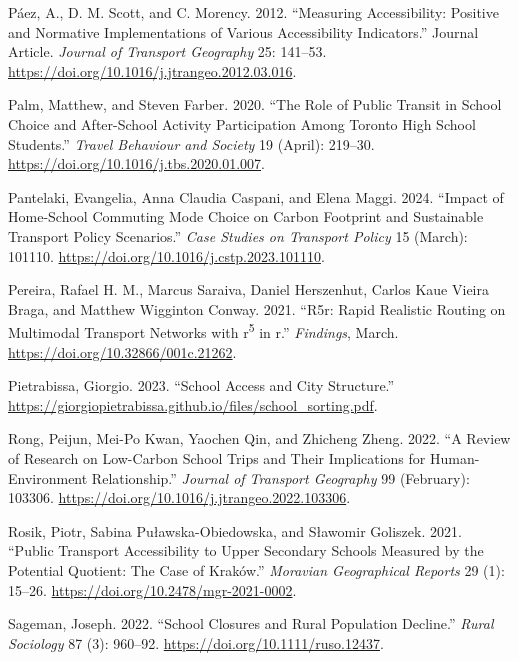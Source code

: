 \documentclass[
default
]{sn-jnl}
\newlength{\cslhangindent}
\newenvironment{CSLReferences}[2] %
 {\begin{list}{}{%
  \setlength{\itemindent}{0pt}
  \setlength{\leftmargin}{0pt}
  \setlength{\parsep}{0pt}
  \ifodd #1
   \setlength{\leftmargin}{\cslhangindent}
   \setlength{\itemindent}{-1\cslhangindent}
  \fi
  \setlength{\itemsep}{#2\baselineskip}}}
 {\end{list}}
\begin{document}
\begin{CSLReferences}{1}{0}
Páez, A., D. M. Scott, and C. Morency. 2012. {``Measuring Accessibility:
Positive and Normative Implementations of Various Accessibility
Indicators.''} Journal Article. \emph{Journal of Transport Geography}
25: 141--53. \url{https://doi.org/10.1016/j.jtrangeo.2012.03.016}.

Palm, Matthew, and Steven Farber. 2020. {``The Role of Public Transit in
School Choice and After-School Activity Participation Among Toronto High
School Students.''} \emph{Travel Behaviour and Society} 19 (April):
219--30. \url{https://doi.org/10.1016/j.tbs.2020.01.007}.

Pantelaki, Evangelia, Anna Claudia Caspani, and Elena Maggi. 2024.
{``Impact of Home-School Commuting Mode Choice on Carbon Footprint and
Sustainable Transport Policy Scenarios.''} \emph{Case Studies on
Transport Policy} 15 (March): 101110.
\url{https://doi.org/10.1016/j.cstp.2023.101110}.

Pereira, Rafael H. M., Marcus Saraiva, Daniel Herszenhut, Carlos Kaue
Vieira Braga, and Matthew Wigginton Conway. 2021. {``R5r: Rapid
Realistic Routing on Multimodal Transport Networks with
r\textsuperscript{5} in r.''} \emph{Findings}, March.
\url{https://doi.org/10.32866/001c.21262}.

Pietrabissa, Giorgio. 2023. {``School Access and City Structure.''}
\url{https://giorgiopietrabissa.github.io/files/school_sorting.pdf}.

Rong, Peijun, Mei-Po Kwan, Yaochen Qin, and Zhicheng Zheng. 2022. {``A
Review of Research on Low-Carbon School Trips and Their Implications for
Human-Environment Relationship.''} \emph{Journal of Transport Geography}
99 (February): 103306.
\url{https://doi.org/10.1016/j.jtrangeo.2022.103306}.

Rosik, Piotr, Sabina Puławska-Obiedowska, and Sławomir Goliszek. 2021.
{``Public Transport Accessibility to Upper Secondary Schools Measured by
the Potential Quotient: The Case of Kraków.''} \emph{Moravian
Geographical Reports} 29 (1): 15--26.
\url{https://doi.org/10.2478/mgr-2021-0002}.

Sageman, Joseph. 2022. {``School Closures and Rural Population
Decline.''} \emph{Rural Sociology} 87 (3): 960--92.
\url{https://doi.org/10.1111/ruso.12437}.


\end{CSLReferences}
\end{document}
